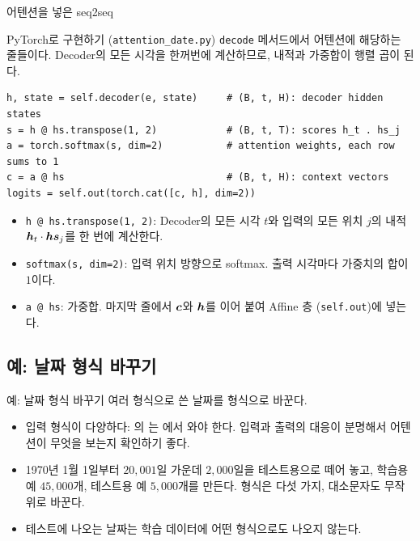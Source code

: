 \documentclass[aspectratio=169,11pt]{beamer}
\begin{document}
\begin{frame}{어텐션을 넣은 seq2seq}
\end{frame}

\begin{frame}[fragile]{PyTorch로 구현하기 (\texttt{attention\_date.py})}
\texttt{decode} 메서드에서 어텐션에 해당하는 줄들이다.
Decoder의 모든 시각을 한꺼번에 계산하므로, 내적과 가중합이 행렬 곱이 된다.
\begin{lstlisting}
h, state = self.decoder(e, state)     # (B, t, H): decoder hidden states
s = h @ hs.transpose(1, 2)            # (B, t, T): scores h_t . hs_j
a = torch.softmax(s, dim=2)           # attention weights, each row sums to 1
c = a @ hs                            # (B, t, H): context vectors
logits = self.out(torch.cat([c, h], dim=2))
\end{lstlisting}
\begin{itemize}
\item \texttt{h @ hs.transpose(1, 2)}: Decoder의 모든 시각 $t$와 입력의 모든 위치 $j$의
  내적 $\bm{h}_t\cdot\bm{hs}_j$를 한 번에 계산한다.
\item \texttt{softmax(s, dim=2)}: 입력 위치 방향으로 softmax.
  출력 시각마다 가중치의 합이 $1$이다.
\item \texttt{a @ hs}: 가중합.
  마지막 줄에서 $\bm{c}$와 $\bm{h}$를 이어 붙여 Affine 층 (\texttt{self.out})에 넣는다.
\end{itemize}
\end{frame}

\subsection{예: 날짜 형식 바꾸기}

\begin{frame}{예: 날짜 형식 바꾸기}
여러 형식으로 쓴 날짜를  형식으로 바꾼다.
\begin{itemize}
\item 입력 형식이 다양하다: 의 는 에서 와야 한다.
  입력과 출력의 대응이 분명해서 어텐션이 무엇을 보는지 확인하기 좋다.
\item 1970년 1월 1일부터 $20{,}001$일 가운데 $2{,}000$일을 테스트용으로 떼어 놓고,
  학습용 예 $45{,}000$개, 테스트용 예 $5{,}000$개를 만든다.
  형식은 다섯 가지, 대소문자도 무작위로 바꾼다.
\item 테스트에 나오는 날짜는 학습 데이터에 어떤 형식으로도 나오지 않는다.
\end{itemize}
\end{frame}
\end{document}
